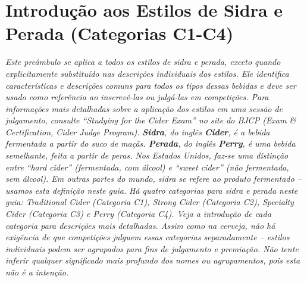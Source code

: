 \section*{Introdução aos Estilos de Sidra e Perada (Categorias C1-C4)}
\textit{Este preâmbulo se aplica a todos os estilos de sidra e perada, exceto quando explicitamente substituído nas descrições individuais dos estilos. Ele identifica características e descrições comuns para todos os tipos dessas bebidas e deve ser usado como referência ao inscrevê-las ou julgá-las em competições. Para informações mais detalhadas sobre a aplicação dos estilos em uma sessão de julgamento, consulte “Studying for the Cider Exam” no site do BJCP (Exam & Certification, Cider Judge Program).}
\textit{\textbf{Sidra}, do inglês \textbf{Cider}, é a bebida fermentada a partir do suco de maçãs. \textbf{Perada}, do inglês \textbf{Perry}, é uma bebida semelhante, feita a partir de peras. Nos Estados Unidos, faz-se uma distinção entre “hard cider”  (fermentada, com álcool) e “sweet cider”  (não fermentada, sem álcool). Em outras partes do mundo, sidra se refere ao produto fermentado – usamos esta definição neste guia.} 
\textit{Há quatro categorias para sidra e perada neste guia: Traditional Cider (Categoria C1), Strong Cider (Categoria C2), Specialty Cider (Categoria C3) e Perry (Categoria C4). Veja a introdução de cada categoria para descrições mais detalhadas. Assim como na cerveja, não há exigência de que competições julguem essas categorias separadamente – estilos individuais podem ser agrupados para fins de julgamento e premiação. Não tente inferir qualquer significado mais profundo dos nomes ou agrupamentos, pois esta não é a intenção.}
